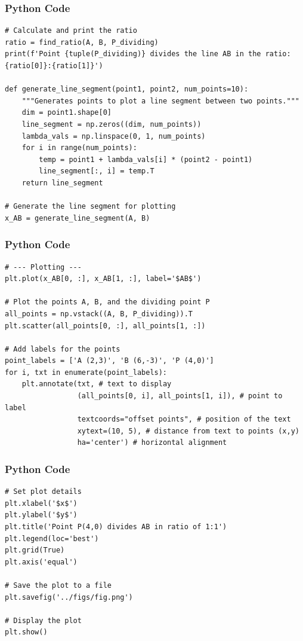 \documentclass{beamer}
\begin{document}
\begin{frame}[fragile]
    \frametitle{Python Code}
    \begin{lstlisting}
# Calculate and print the ratio
ratio = find_ratio(A, B, P_dividing)
print(f'Point {tuple(P_dividing)} divides the line AB in the ratio: {ratio[0]}:{ratio[1]}')

def generate_line_segment(point1, point2, num_points=10):
    """Generates points to plot a line segment between two points."""
    dim = point1.shape[0]
    line_segment = np.zeros((dim, num_points))
    lambda_vals = np.linspace(0, 1, num_points)
    for i in range(num_points):
        temp = point1 + lambda_vals[i] * (point2 - point1)
        line_segment[:, i] = temp.T
    return line_segment

# Generate the line segment for plotting
x_AB = generate_line_segment(A, B)
    \end{lstlisting}
\end{frame}
\begin{frame}[fragile]
    \frametitle{Python Code}
    \begin{lstlisting}
# --- Plotting ---
plt.plot(x_AB[0, :], x_AB[1, :], label='$AB$')

# Plot the points A, B, and the dividing point P
all_points = np.vstack((A, B, P_dividing)).T
plt.scatter(all_points[0, :], all_points[1, :])

# Add labels for the points
point_labels = ['A (2,3)', 'B (6,-3)', 'P (4,0)']
for i, txt in enumerate(point_labels):
    plt.annotate(txt, # text to display
                 (all_points[0, i], all_points[1, i]), # point to label
                 textcoords="offset points", # position of the text
                 xytext=(10, 5), # distance from text to points (x,y)
                 ha='center') # horizontal alignment
    \end{lstlisting}
\end{frame}
\begin{frame}[fragile]
    \frametitle{Python Code}
    \begin{lstlisting}
# Set plot details
plt.xlabel('$x$')
plt.ylabel('$y$')
plt.title('Point P(4,0) divides AB in ratio of 1:1')
plt.legend(loc='best')
plt.grid(True)
plt.axis('equal')

# Save the plot to a file
plt.savefig('../figs/fig.png')

# Display the plot
plt.show()
    \end{lstlisting}
\end{frame}
\end{document}
